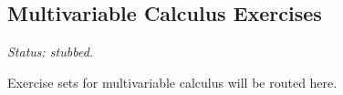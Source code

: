 \subsection*{Multivariable Calculus Exercises}

\textit{Status: stubbed.}

Exercise sets for multivariable calculus will be routed here.
